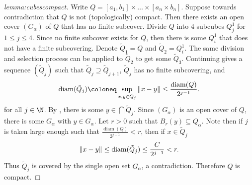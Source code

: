 \documentclass[../main.tex]{subfiles}
\begin{document}
\begin{proof}[lemma:cubescompact]
    Write $Q = [a_1, b_1] \times \ldots \times [a_n \times b_n]$. Suppose towards contradiction that $Q$ is not (topologically) compact. Then there exists an open cover $(G_{\alpha})$ of $Q$ that has no finite subcover. Divide $Q$ into $4$ subcubes $Q^{1}_{j}$ for $1 \leq j \leq 4$. Since no finite subcover exists for $Q$, then there is some $Q^{1}_{i}$ that does not have a finite subcovering. Denote $\tilde{Q}_1 = Q$ and $\tilde{Q}_2 = Q^{1}_i$. The same division and selection process can be applied to $\tilde{Q}_2$ to get some $\tilde{Q}_3$. Continuing gives a sequence $(\tilde{Q}_j)$ such that $\tilde{Q}_j \supseteq \tilde{Q}_{j+1}$, $\tilde{Q}_j$ has no finite subcovering, and
    \[
        \operatorname{diam}(\tilde{Q}_j) \coloneq \sup_{x,y \in \tilde{Q}_j} \norm{x - y} \leq \frac{\operatorname{diam}(Q)}{2^{j-1}}
    .\]
    for all $j \in \N$. By , there is some $y \in \bigcap \tilde{Q}_j$. Since $(G_{\alpha})$ is an open cover of $Q$, there is some $G_{\alpha}$ with $y \in G_{\alpha}$. Let $r > 0$ such that $B_r(y) \subseteq Q_{\alpha}$. Note then if $j$ is taken large enough such that $\frac{\operatorname{diam}(Q)}{2^{j-1}} < r$, then if $x \in \tilde{Q}_j$
    \[
        \norm{x - y} \leq \operatorname{diam}(\tilde{Q}_j) \leq \frac{C}{2^{j-1}} < r
    .\]
    Thus $\tilde{Q}_j$ is covered by the single open set $G_{\alpha}$, a contradiction. Therefore $Q$ is compact.
\end{proof}
\end{document}
